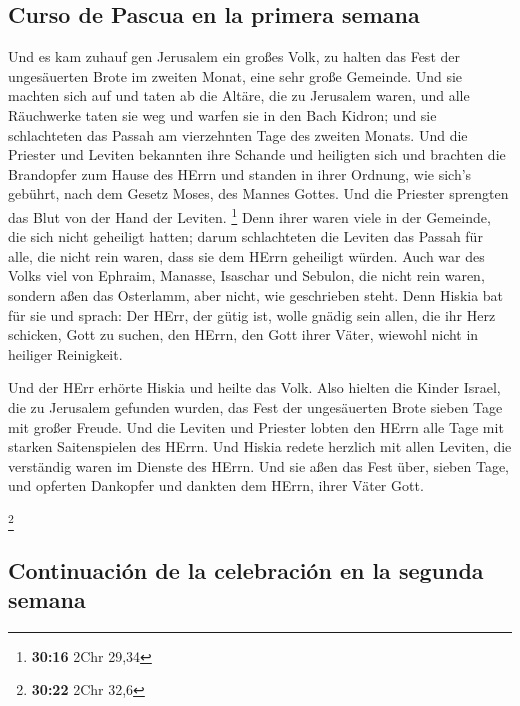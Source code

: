 \hypertarget{curso-de-pascua-en-la-primera-semana}{%
\subsection{Curso de Pascua en la primera
semana}\label{curso-de-pascua-en-la-primera-semana}}

 Und es kam zuhauf gen Jerusalem ein großes Volk, zu
halten das Fest der ungesäuerten Brote im zweiten Monat, eine sehr große
Gemeinde.  Und sie machten sich auf und taten ab die
Altäre, die zu Jerusalem waren, und alle Räuchwerke taten sie weg und
warfen sie in den Bach Kidron;  und sie schlachteten das
Passah am vierzehnten Tage des zweiten Monats. Und die Priester und
Leviten bekannten ihre Schande und heiligten sich und brachten die
Brandopfer zum Hause des HErrn  und standen in ihrer
Ordnung, wie sich's gebührt, nach dem Gesetz Moses, des Mannes Gottes.
Und die Priester sprengten das Blut von der Hand der Leviten.
\footnote{\textbf{30:16} 2Chr 29,34}  Denn ihrer waren
viele in der Gemeinde, die sich nicht geheiligt hatten; darum
schlachteten die Leviten das Passah für alle, die nicht rein waren, dass
sie dem HErrn geheiligt würden.  Auch war des Volks viel
von Ephraim, Manasse, Isaschar und Sebulon, die nicht rein waren,
sondern aßen das Osterlamm, aber nicht, wie geschrieben steht. Denn
Hiskia bat für sie und sprach: Der HErr, der gütig ist, wolle gnädig
sein  allen, die ihr Herz schicken, Gott zu suchen, den
HErrn, den Gott ihrer Väter, wiewohl nicht in heiliger Reinigkeit.

 Und der HErr erhörte Hiskia und heilte das Volk.
 Also hielten die Kinder Israel, die zu Jerusalem
gefunden wurden, das Fest der ungesäuerten Brote sieben Tage mit großer
Freude. Und die Leviten und Priester lobten den HErrn alle Tage mit
starken Saitenspielen des HErrn.  Und Hiskia redete
herzlich mit allen Leviten, die verständig waren im Dienste des HErrn.
Und sie aßen das Fest über, sieben Tage, und opferten Dankopfer und
dankten dem HErrn, ihrer Väter Gott.

\footnote{\textbf{30:22} 2Chr 32,6}

\hypertarget{continuaciuxf3n-de-la-celebraciuxf3n-en-la-segunda-semana}{%
\subsection{Continuación de la celebración en la segunda
semana}\label{continuaciuxf3n-de-la-celebraciuxf3n-en-la-segunda-semana}}

